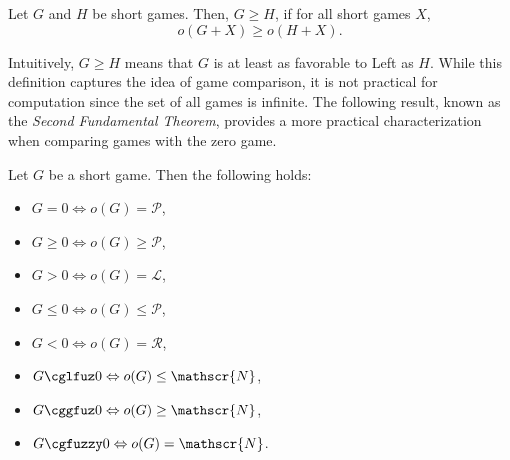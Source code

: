 \documentclass[oneside,reqno]{amsart}
\begin{document}
    
    \begin{definition}
        Let $G$ and $H$ be short games. Then, $G\ge H$, if for all short games $X$, $$o(G+X)\ge o(H+X). $$
    \end{definition}
    Intuitively, $G \ge H$ means that $G$ is at least as favorable to Left as $H$.  
    While this definition captures the idea of game comparison, it is not practical for computation since the set of all games is infinite.  
    The following result, known as the \emph{Second Fundamental Theorem}, provides a more practical characterization when comparing games with the zero game.
    
   \begin{theorem}\label{thm: second fundamental theorem}
        Let $G$ be a short game. Then the following holds:
        \begin{itemize}
            \item $G=0 \Leftrightarrow o(G)=\mathscr{P}$,
            \item $G\ge 0 \Leftrightarrow o(G)\ge \mathscr{P}$,
            \item $G> 0 \Leftrightarrow o(G)=\mathscr{L}$,
            \item $G\le 0 \Leftrightarrow o(G)\le \mathscr{P}$,
            \item $G< 0 \Leftrightarrow o(G)= \mathscr{R}$,
            \item $G\cglfuz 0 \Leftrightarrow o(G)\le \mathscr{N}$,
            \item $G \cggfuz 0 \Leftrightarrow o(G)\ge \mathscr{N}$,
            \item $G\cgfuzzy 0 \Leftrightarrow o(G)= \mathscr{N}$.
        \end{itemize} 
    \end{theorem}

\end{document}
